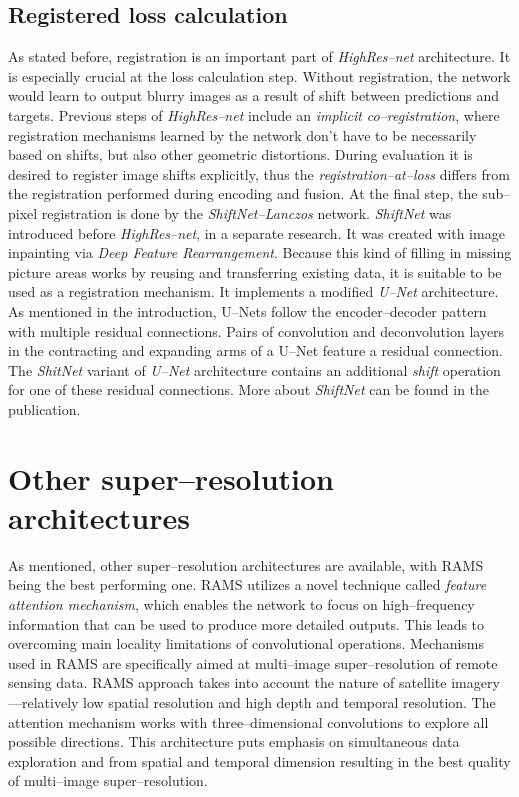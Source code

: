 \subsection{Registered loss calculation}
\label{sec:shiftnet}
As stated before, registration is an important part of \textit{HighRes--net} architecture.
It is especially crucial at the loss calculation step.
Without registration, the network would learn to output blurry images as a result of shift between predictions and targets.
Previous steps of \textit{HighRes--net} include an \textit{implicit co--registration}, where registration mechanisms learned by the network don't have to be necessarily based on shifts, but also other geometric distortions.
During evaluation it is desired to register image shifts explicitly, thus the \textit{registration--at--loss} differs from the registration performed during encoding and fusion.
At the final step, the sub--pixel registration is done by the \textit{ShiftNet--Lanczos} network.
\textit{ShiftNet} \cite{zhaoyi-2018-shiftnet} was introduced before \textit{HighRes--net}, in a separate research.
It was created with image inpainting via \textit{Deep Feature Rearrangement}.
Because this kind of filling in missing picture areas works by reusing and transferring existing data, it is suitable to be used as a registration mechanism.
It implements a modified \textit{U--Net} \cite{ronnenberger-2015-unet} architecture.
As mentioned in the introduction, U--Nets follow the encoder--decoder pattern with multiple residual connections.
Pairs of convolution and deconvolution layers in the contracting and expanding arms of a U--Net feature a residual connection.
The \textit{ShitNet} variant of \textit{U--Net} architecture contains an additional \textit{shift} operation for one of these residual connections.
More about \textit{ShiftNet} can be found in the publication.

\section{Other super--resolution architectures}
As mentioned, other super--resolution architectures are available, with RAMS \cite{salvetti-2020-rams} being the best performing one.
RAMS utilizes a novel technique called \textit{feature attention mechanism}, which enables the network to focus on high--frequency information that can be used to produce more detailed outputs.
This leads to overcoming main locality limitations of convolutional operations.
Mechanisms used in RAMS are specifically aimed at multi--image super--resolution of remote sensing data.
RAMS approach takes into account the nature of satellite imagery---relatively low spatial resolution and high depth and temporal resolution.
The attention mechanism works with three--dimensional convolutions to explore all possible directions.
This architecture puts emphasis on simultaneous data exploration and from spatial and temporal dimension resulting in the best quality of multi--image super--resolution.

